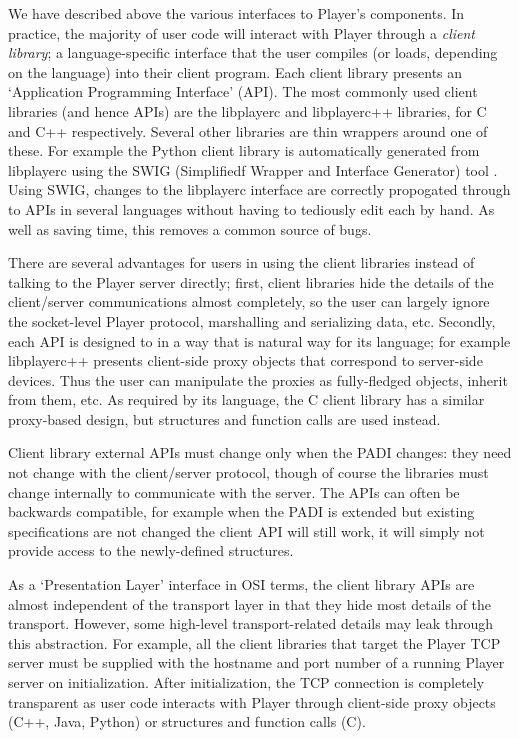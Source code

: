 
We have described above the various interfaces to Player's
components. In practice, the majority of user code will interact with
Player through a {\it client library}; a language-specific interface
that the user compiles (or loads, depending on the language) into
their client program. Each client library presents an `Application
Programming Interface' (API). The most commonly used client libraries
(and hence APIs) are the libplayerc and libplayerc++ libraries, for C
and C++ respectively. Several other libraries are thin wrappers around
one of these. For example the Python client library is automatically
generated from libplayerc using the SWIG (Simplifiedf Wrapper and
Interface Generator) tool \cite{32_swig}. Using SWIG, changes to the
libplayerc interface are correctly propogated through to APIs in
several languages without having to tediously edit each by hand. As
well as saving time, this removes a common source of bugs.

There are several advantages for users in using the client libraries
instead of talking to the Player server directly; first, client
libraries hide the details of the client/server communications almost
completely, so the user can largely ignore the socket-level Player
protocol, marshalling and serializing data, etc. Secondly, each API is
designed to in a way that is natural way for its language; for example
libplayerc++ presents client-side proxy objects that correspond to
server-side devices. Thus the user can manipulate the proxies as
fully-fledged objects, inherit from them, etc. As required by its
language, the C client library has a similar proxy-based design, but
structures and function calls are used instead.

Client library external APIs must change only when the PADI changes:
they need not change with the client/server protocol, though of course
the libraries must change internally to communicate with the
server. The APIs can often be backwards compatible, for example when
the PADI is extended but existing specifications are not changed the
client API will still work, it will simply not provide access to the
newly-defined structures.

As a `Presentation Layer' interface in OSI terms, the client library
APIs are almost independent of the transport layer in that they hide
most details of the transport. However, some high-level
transport-related details may leak through this abstraction. For
example, all the client libraries that target the Player TCP server
must be supplied with the hostname and port number of a running Player
server on initialization. After initialization, the TCP connection is
completely transparent as user code interacts with Player through
client-side proxy objects (C++, Java, Python) or structures and
function calls (C).

